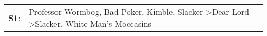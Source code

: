 \begin{supertabular}{p{0.03\textwidth}p{0.92\textwidth}}
 \textbf{S1}:  &  Professor Wormbog\textsuperscript{}, \enspace Bad Poker\textsuperscript{}, \enspace Kimble\textsuperscript{}, \enspace Slacker\textsuperscript{} \textgreater \enspace Dear Lord\textsuperscript{} \textgreater \enspace Slacker\textsuperscript{}, \enspace White Man's Moccasins\textsuperscript{}  \enspace  \\
\end{supertabular}
